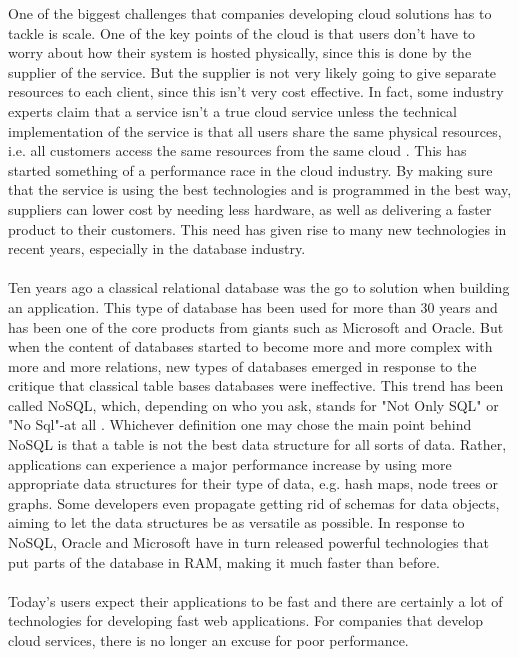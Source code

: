 \documentclass{cslthse-msc}
\begin{document}
One of the biggest challenges that companies developing cloud solutions has to tackle is scale. One of the key points of the cloud is that users don't have to worry about how their system is hosted physically, since this is done by the supplier of the service. But the supplier is not very likely going to give separate resources to each client, since this isn't very cost effective. In fact, some industry experts claim that a service isn't a true cloud service unless the technical implementation of the service is that all users share the same physical resources, i.e. all customers access the same resources from the same cloud \cite{Netsuite15}. This has started something of a performance race in the cloud industry. By making sure that the service is using the best technologies and is programmed in the best way, suppliers can lower cost by needing less hardware, as well as delivering a faster product to their customers. This need has given rise to many new technologies in recent years, especially in the database industry.\\\\
Ten years ago a classical relational database was the go to solution when building an application. This type of database has been used for more than 30 years and has been one of the core products from giants such as Microsoft and Oracle. But when the content of databases started to become more and more complex with more and more relations, new types of databases emerged in response to the critique that classical table bases databases were ineffective. This trend has been called NoSQL, which, depending on who you ask, stands for "Not Only SQL" or "No Sql"-at all \cite{Fowler12}. Whichever definition one may chose the main point behind NoSQL is that a table is not the best data structure for all sorts of data. Rather, applications can experience a major performance increase by using more appropriate data structures for their type of data, e.g. hash maps, node trees or graphs. Some developers even propagate getting rid of schemas for data objects, aiming to let the data structures be as versatile as possible. In response to NoSQL, Oracle and Microsoft have in turn released powerful technologies that put parts of the database in RAM, making it much faster than before.\\\\
Today's users expect their applications to be fast and there are certainly a lot of technologies for developing fast web applications. For companies that develop cloud services, there is no longer an excuse for poor performance.
\end{document}
